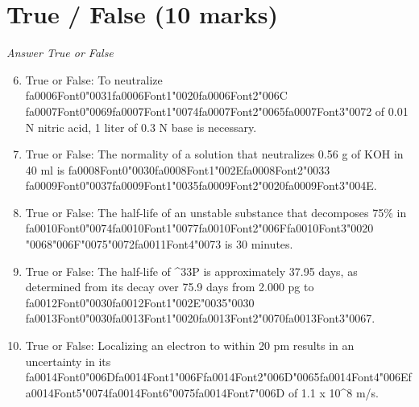 \documentclass[12pt]{article}
\begin{document}
\section*{True / False (10 marks)}
\textit{Answer True or False}
\begin{enumerate}[label=\arabic*.]
\setcounter{enumi}{5}
\item True or False: To neutralize {\csname fa0006Font0\endcsname\char"0031}{\csname fa0006Font1\endcsname\char"0020}{\csname fa0006Font2\endcsname\char"006C} {\csname fa0007Font0\endcsname\char"0069}{\csname fa0007Font1\endcsname\char"0074}{\csname fa0007Font2\endcsname\char"0065}{\csname fa0007Font3\endcsname\char"0072} of 0.01 N nitric acid, 1 liter of 0.3 N base is necessary.
\item True or False: The normality of a solution that neutralizes 0.56 g of KOH in 40 ml is {\csname fa0008Font0\endcsname\char"0030}{\csname fa0008Font1\endcsname\char"002E}{\csname fa0008Font2\endcsname\char"0033} {\csname fa0009Font0\endcsname\char"0037}{\csname fa0009Font1\endcsname\char"0035}{\csname fa0009Font2\endcsname\char"0020}{\csname fa0009Font3\endcsname\char"004E}.
\item True or False: The half-life of an unstable substance that decomposes 75\% in {\csname fa0010Font0\endcsname\char"0074}{\csname fa0010Font1\endcsname\char"0077}{\csname fa0010Font2\endcsname\char"006F}{\csname fa0010Font3\endcsname\char"0020} {\char"0068}{\char"006F}{\char"0075}{\char"0072}{\csname fa0011Font4\endcsname\char"0073} is 30 minutes.
\item True or False: The half-life of \^{}33P is approximately 37.95 days, as determined from its decay over 75.9 days from 2.000 pg to {\csname fa0012Font0\endcsname\char"0030}{\csname fa0012Font1\endcsname\char"002E}{\char"0035}{\char"0030} {\csname fa0013Font0\endcsname\char"0030}{\csname fa0013Font1\endcsname\char"0020}{\csname fa0013Font2\endcsname\char"0070}{\csname fa0013Font3\endcsname\char"0067}.
\item True or False: Localizing an electron to within 20 pm results in an uncertainty in its {\csname fa0014Font0\endcsname\char"006D}{\csname fa0014Font1\endcsname\char"006F}{\csname fa0014Font2\endcsname\char"006D}{\char"0065}{\csname fa0014Font4\endcsname\char"006E}{\csname fa0014Font5\endcsname\char"0074}{\csname fa0014Font6\endcsname\char"0075}{\csname fa0014Font7\endcsname\char"006D} of 1.1 x 10\^{}8 m/s.
\end{enumerate}
\end{document}
